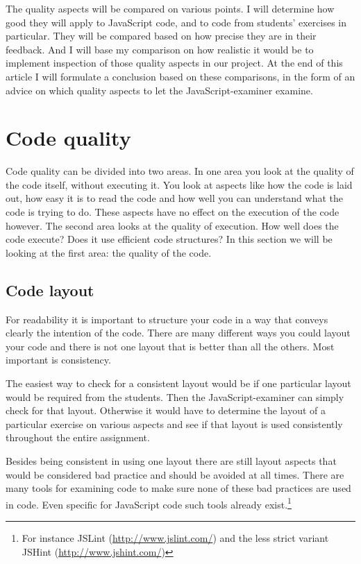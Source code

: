 \documentclass{article}
\begin{document}
The quality aspects will be compared on various points. I will determine how
good they will apply to JavaScript code, and to code from students' exercises
in particular. They will be compared based on how precise they are in their
feedback. And I will base my comparison on how realistic it would be to
implement inspection of those quality aspects in our project. At the end of this article I will formulate a conclusion based on these comparisons, in the form of an advice on which quality aspects to let the JavaScript-examiner examine.

\section{Code quality}

Code quality can be divided into two areas. In one area you look at the quality
of the code itself, without executing it. You look at aspects like how the code
is laid out, how easy it is to read the code and how well you can understand
what the code is trying to do. These aspects have no effect on the execution of
the code however. The second area looks at the quality of execution. How well
does the code execute? Does it use efficient code structures? In this section we will be looking at the first area: the quality of the code.

\subsection{Code layout}

For readability it is important to structure your code in a way that conveys clearly the intention of the code. There are many different ways you could layout your code and there is not one layout that is better than all the others. Most important is consistency.

The easiest way to check for a consistent layout would be if one particular layout would be required from the students. Then the JavaScript-examiner can simply check for that layout. Otherwise it would have to determine the layout of a particular exercise on various aspects and see if that layout is used consistently throughout the entire assignment.

Besides being consistent in using one layout there are still layout aspects
that would be considered bad practice and should be avoided at all times. There
are many tools for examining code to make sure none of these bad practices are
used in code. Even specific for JavaScript code such tools already
exist.\footnote{For instance JSLint (\url{http://www.jslint.com/}) and the less
strict variant JSHint (\url{http://www.jshint.com/})}
\end{document}
